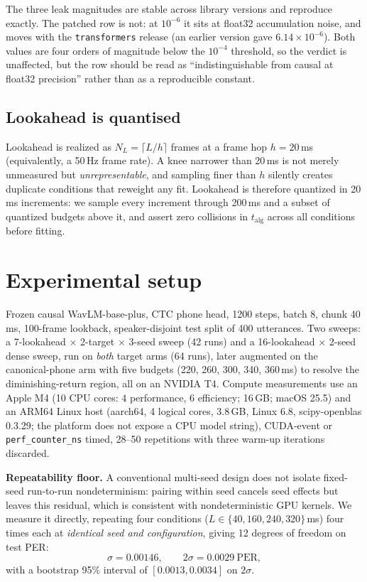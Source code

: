 \documentclass[journal]{IEEEtran}
\begin{document}
The three leak magnitudes are stable across library versions and reproduce
exactly. The patched row is not: at $10^{-6}$ it sits at float32 accumulation
noise, and moves with the \texttt{transformers} release (an earlier version
gave $6.14\times10^{-6}$). Both values are four orders of magnitude below the
$10^{-4}$ threshold, so the verdict is unaffected, but the row should be
read as ``indistinguishable from causal at float32 precision'' rather than as
a reproducible constant.

\subsection{Lookahead is quantised}
\label{sec:quant}

Lookahead is realized as $N_L=\lceil L/h \rceil$ frames at a frame hop
$h=20$\,ms (equivalently, a 50\,Hz frame rate).
A knee narrower than 20\,ms is not merely unmeasured but
\emph{unrepresentable}, and sampling finer than $h$ silently creates duplicate
conditions that reweight any fit. Lookahead is therefore quantized in 20\,ms increments: we sample every
increment through 200\,ms and a subset of quantized budgets above it, and
assert zero collisions in $t_{\mathrm{alg}}$ across all conditions before
fitting.

\section{Experimental setup}

Frozen causal WavLM-base-plus, CTC phone head, 1200 steps, batch 8, chunk
40\,ms, 100-frame lookback, speaker-disjoint test split of 400 utterances.
Two sweeps: a 7-lookahead $\times$ 2-target $\times$ 3-seed sweep (42 runs)
and a 16-lookahead $\times$ 2-seed dense sweep, run on \emph{both} target arms
(64 runs), later augmented on the canonical-phone arm with five budgets (220, 260,
300, 340, 360\,ms) to resolve the diminishing-return region, all on an NVIDIA
T4. Compute measurements use an Apple M4
(10 CPU cores: 4 performance, 6 efficiency; 16\,GB; macOS 25.5) and an
ARM64 Linux host (aarch64, 4 logical cores, 3.8\,GB, Linux 6.8,
scipy-openblas 0.3.29; the platform does not expose a CPU model string), CUDA-event or \texttt{perf\_counter\_ns} timed, 28--50 repetitions
with three warm-up iterations discarded.

\noindent\textbf{Repeatability floor.} A conventional multi-seed design does
not isolate fixed-seed run-to-run nondeterminism: pairing within seed cancels
seed effects but leaves this residual, which is consistent with nondeterministic GPU
kernels. We measure it directly, repeating four conditions
($L\in\{40,160,240,320\}$\,ms) four times each at \emph{identical seed and
configuration}, giving 12 degrees of freedom on test PER:
\begin{equation}
\sigma = 0.00146, \qquad 2\sigma = \mathbf{0.0029}\ \text{PER},
\label{eq:floor}
\end{equation}
with a bootstrap 95\% interval of $[0.0013, 0.0034]$ on $2\sigma$.
\end{document}
